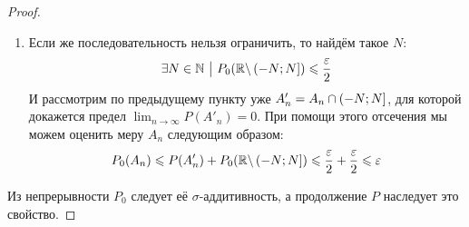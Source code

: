\begin{proof}
\begin{enumerate}
		\item Если же последовательность нельзя ограничить, то найдём такое $N$:
		\[
			\exists N \in \mathbb{N} \ \big|\  P_0(\mathbb{R} \backslash \left(-N; N\right]) \leqslant \frac{\varepsilon}{2}
		\]
		И рассмотрим по предыдущему пункту уже $A'_n = A_n \cap \left(-N; N\right]$, для которой докажется предел $\lim_{n \to \infty} P(A'_n) = 0$. При помощи этого отсечения мы можем оценить меру $A_n$ следующим образом:
		\[
			P_0(A_n) \leqslant P(A'_n) + P_0(\mathbb{R} \backslash \left(-N; N\right]) \leqslant \frac{\varepsilon}{2} + \frac{\varepsilon}{2} \leqslant \varepsilon
		\]
	\end{enumerate}
	Из непрерывности $P_0$ следует её $\sigma$-аддитивность, а продолжение $P$ наследует это свойство.
\end{proof}